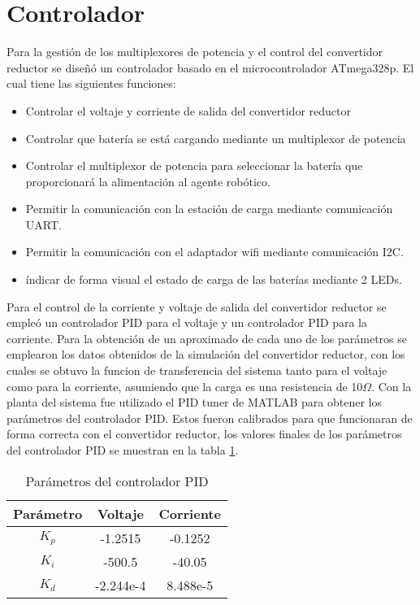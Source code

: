 \section{Controlador}
    \label{sec:controlador}
    Para la gestión de los multiplexores de potencia y el control del convertidor
    reductor se diseñó un controlador basado en el microcontrolador ATmega328p.
    El cual tiene las siguientes funciones:

    \begin{itemize}
        \item Controlar el voltaje y corriente de salida del convertidor reductor
        \item Controlar que batería se está cargando mediante un multiplexor de potencia
        \item Controlar el multiplexor de potencia para seleccionar la batería
        que proporcionará la alimentación al agente robótico.
        \item Permitir la comunicación con la estación de carga mediante comunicación
        UART.
        \item  Permitir la comunicación con el adaptador wifi mediante comunicación
        I2C.
        \item índicar de forma visual el estado de carga de las baterías mediante
        2 LEDs.
    \end{itemize}

    Para el control de la corriente y voltaje de salida del convertidor reductor
    se empleó un controlador PID para el voltaje y un controlador PID para la corriente.
    Para la obtención de un aproximado de cada uno de los parámetros se emplearon 
    los datos obtenidos de la simulación del convertidor reductor, con los cuales 
    se obtuvo la funcion de transferencia del sistema tanto para el voltaje como
    para la corriente, asumiendo que la carga es una resistencia de 10$\Omega$. Con
    la planta del sistema fue utilizado el PID tuner de MATLAB para obtener los
    parámetros del controlador PID. Estos fueron calibrados para que funcionaran 
    de forma correcta con el convertidor reductor, los valores finales de los
    parámetros del controlador PID se muestran en la tabla \ref{tab:pid_parameters}.

    \begin{table}[H]
        \centering
        \begin{tabular}{|c|c|c|}
            \hline
            Parámetro & Voltaje & Corriente\\
            \hline
            $K_p$ & -1.2515 & -0.1252\\
            \hline
            $K_i$ & -500.5 & -40.05 \\
            \hline
            $K_d$ & -2.244e-4 & 8.488e-5 \\
            \hline
        \end{tabular}
        \caption{Parámetros del controlador PID}
        \label{tab:pid_parameters}
    \end{table}

